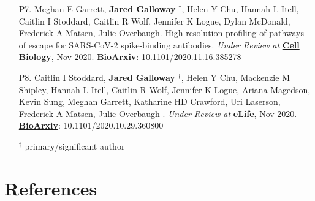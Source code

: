 \documentclass[letterpaper,11pt]{article}
\let\oldhref\href
\renewcommand{\href}[2]{\oldhref{#1}{\bfseries#2}}
\newcommand{\resumeItem}[2]{
  \item\small{
    \textbf{#1}{: #2 \vspace{-2pt}}
  }
}
\newcommand{\resumeSubItem}[2]{\resumeItem{#1}{#2}\vspace{-4pt}}
\newcommand{\resumeSubHeadingListStart}{\begin{itemize}[leftmargin=*]}
\newcommand{\resumeSubHeadingListEnd}{\end{itemize}}
\begin{document}
\begin{enumerate}
\item [P7.] Meghan E Garrett, \textbf{Jared Galloway} $^{\dagger}$, 
Helen Y Chu, Hannah L Itell, Caitlin I Stoddard, Caitlin R Wolf, Jennifer K Logue, Dylan McDonald, Frederick A Matsen, Julie Overbaugh.
High resolution profiling of pathways of escape for SARS-CoV-2 spike-binding antibodies.
\textit{Under Review at}
\href{https://www.nature.com/ncb/}{Cell Biology}, Nov 2020.
\href{https://www.biorxiv.org/content/10.1101/2020.11.16.385278v1.abstract}{BioArxiv}: 10.1101/2020.11.16.385278


\item [P8.] Caitlin I Stoddard, \textbf{Jared Galloway} $^{\dagger}$, 
Helen Y Chu, Mackenzie M Shipley, Hannah L Itell, 
Caitlin R Wolf, Jennifer K Logue, Ariana Magedson, Kevin Sung, Meghan Garrett, Katharine HD Crawford, Uri Laserson, Frederick A Matsen, Julie Overbaugh . 
\textit{Under Review at}
\href{https://elifesciences.org/?gclid=CjwKCAiA6vXwBRBKEiwAYE7iS0LA_KboY5NjoOVJAMq06BEUSsqPFV9R1GA1NUUIgYw2XgTiv1fUxhoC3xYQAvD_BwE}{eLife}, Nov 2020.
\href{biorxiv.org/content/10.1101/2020.10.29.360800v1.abstract}{BioArxiv}: 10.1101/2020.10.29.360800

\begin{center}
$^{\dagger}$ primary/significant author
\end{center}

\end{enumerate}

%


\section{References}
\end{document}
